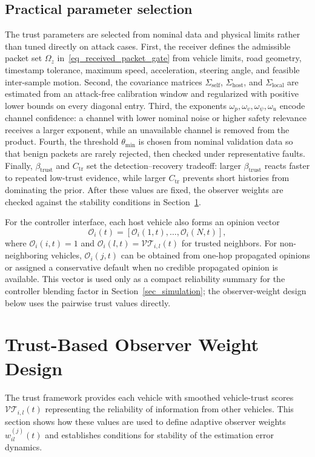 \documentclass[journal,twoside]{IEEEtran}
\def\VT{\mathcal{VT}} %
\def\O{\mathcal{O}} %
\begin{document}
\subsection{Practical parameter selection}\label{subsec_trust_tuning}
The trust parameters are selected from nominal data and physical limits rather than tuned directly on attack cases. First, the receiver defines the admissible packet set $\Omega_z$ in~\eqref{eq_received_packet_gate} from vehicle limits, road geometry, timestamp tolerance, maximum speed, acceleration, steering angle, and feasible inter-sample motion. Second, the covariance matrices $\Sigma_{\text{self}}$, $\Sigma_{\text{host}}$, and $\Sigma_{\text{local}}$ are estimated from an attack-free calibration window and regularized with positive lower bounds on every diagonal entry. Third, the exponents $\omega_p,\omega_v,\omega_\psi,\omega_u$ encode channel confidence: a channel with lower nominal noise or higher safety relevance receives a larger exponent, while an unavailable channel is removed from the product. Fourth, the threshold $\theta_{\min}$ is chosen from nominal validation data so that benign packets are rarely rejected, then checked under representative faults. Finally, $\beta_{\text{trust}}$ and $C_{\mathrm{tr}}$ set the detection--recovery tradeoff: larger $\beta_{\text{trust}}$ reacts faster to repeated low-trust evidence, while larger $C_{\mathrm{tr}}$ prevents short histories from dominating the prior. After these values are fixed, the observer weights are checked against the stability conditions in Section~\ref{sec_weight_design}.

For the controller interface, each host vehicle also forms an opinion vector
\begin{equation}
    \O_i(t)=[\O_i(1,t),\ldots,\O_i(N,t)],
\end{equation}
where $\O_i(i,t)=1$ and $\O_i(l,t)=\VT_{i,l}(t)$ for trusted neighbors. For non-neighboring vehicles, $\O_i(j,t)$ can be obtained from one-hop propagated opinions or assigned a conservative default when no credible propagated opinion is available. This vector is used only as a compact reliability summary for the controller blending factor in Section~\ref{sec_simulation}; the observer-weight design below uses the pairwise trust values directly.

\section{Trust-Based Observer Weight Design}\label{sec_weight_design}
The trust framework provides each vehicle with smoothed vehicle-trust scores $\VT_{i,l}(t)$ representing the reliability of information from other vehicles.
This section shows how these values are used to define adaptive observer weights $w_{il}^{(j)}(t)$ and establishes conditions for stability of the estimation error dynamics.
\end{document}
